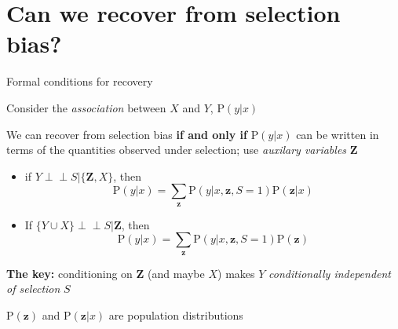 \documentclass[
  ignorenonframetext,
]{beamer}
\providecommand{\tightlist}{%
  \setlength{\itemsep}{0pt}\setlength{\parskip}{0pt}}
\newcommand\ci{\perp\!\!\!\perp}
\begin{document}
\hypertarget{can-we-recover-from-selection-bias}{%
\section{Can we recover from selection
bias?}\label{can-we-recover-from-selection-bias}}

\begin{frame}{Formal conditions for recovery}
\protect\hypertarget{formal-conditions-for-recovery}{}

Consider the \emph{association} between \(X\) and \(Y\),
\(\text{P}(y|x)\)

We can recover from selection bias \textbf{if and only if}
\(\text{P}(y|x)\) can be written in terms of the quantities observed
under selection; use \emph{auxilary variables} \(\mathbf{Z}\)

\begin{itemize}
\tightlist
\item
  if \(Y \ci S | \{\mathbf{Z}, X\}\), then
  \[\text{P}(y|x) = \sum_\mathbf{z} \text{P}(y|x, \mathbf{z}, S=1)\text{P}(\mathbf{z}|x)\]
\item
  If \(\{Y \cup X\} \ci S | \mathbf{Z}\), then
  \[\text{P}(y|x) = \sum_\mathbf{z} \text{P}(y|x, \mathbf{z}, S=1)\text{P}(\mathbf{z})\]
\end{itemize}

\textbf{The key:} conditioning on \(\mathbf{Z}\) (and maybe \(X\)) makes
\(Y\) \emph{conditionally independent of selection} \(S\)

\(\text{P}(\mathbf{z})\) and \(\text{P}(\mathbf{z}|x)\) are population
distributions

\end{frame}
\end{document}
